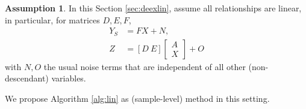 \documentclass[letterpaper]{article} %
\theoremstyle{definition}%
\theoremstyle{definition}
\newtheorem{assumption}{Assumption} %
\newcommand{\Obs}{Y}
\newcommand{\Out}{Z}
\begin{document}

\newcommand{\Oa}{W}
\newcommand{\oa}{w}
\newcommand{\om}{F}
\newcommand{\No}{N}
\newcommand{\no}{n}
\newcommand{\Noz}{O}
\newcommand{\noz}{o}

\newcommand{\stax}{\left[\begin{smallmatrix}A \\ X\end{smallmatrix}\right]}

\newcommand{\samplelen}{\ell}

\newcommand{\idm}{\mathbf{1}}


\begin{assumption}
	\label{eqn:contas}
	In this Section \ref{sec:deexlin}, assume all relationships are linear, in particular, for matrices $D, E, F$,
	\begin{align}
	\Obs_S &= \om X + \No ,\quad \label{eqn:c1} \\ %
	\Out &= [D\ E] \left[
	\begin{array}{c} 
	A \\ X
	\end{array} 
	\right]
	+ \Noz \label{eqn:c2}
	\end{align}
	with $\No, \Noz$ the usual noise terms that are independent of all other (non-descendant) variables.
\end{assumption}%
We propose Algorithm \ref{alg:lin} as (sample-level) method in this setting.
\end{document}
